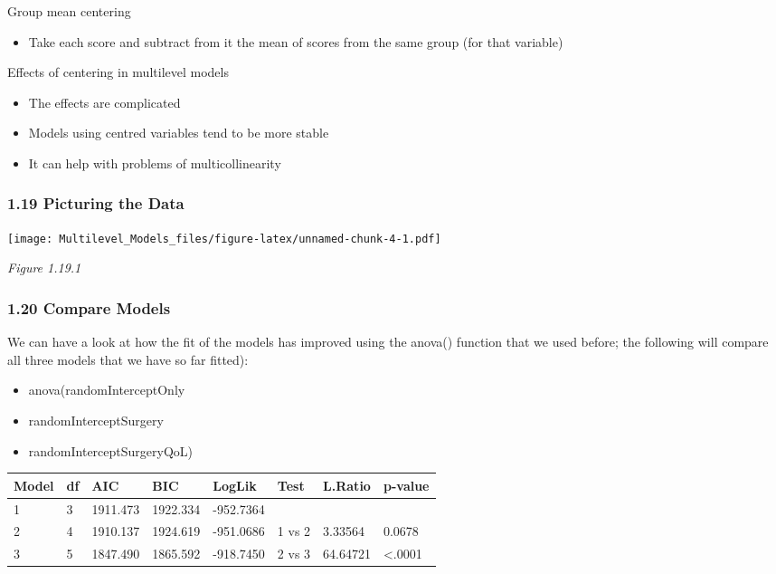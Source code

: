 \documentclass[
]{article}
\providecommand{\tightlist}{%
  \setlength{\itemsep}{0pt}\setlength{\parskip}{0pt}}
\begin{document}
Group mean centering

\begin{itemize}
\tightlist
\item
  Take each score and subtract from it the mean of scores from the same
  group (for that variable)
\end{itemize}

Effects of centering in multilevel models

\begin{itemize}
\tightlist
\item
  The effects are complicated
\item
  Models using centred variables tend to be more stable
\item
  It can help with problems of multicollinearity
\end{itemize}

\hypertarget{picturing-the-data}{%
\subsubsection{1.19 Picturing the Data}\label{picturing-the-data}}

\texttt{[image: Multilevel\_Models\_files/figure-latex/unnamed-chunk-4-1.pdf]}

\emph{Figure 1.19.1}

\hypertarget{compare-models}{%
\subsubsection{1.20 Compare Models}\label{compare-models}}

We can have a look at how the fit of the models has improved using the
anova() function that we used before; the following will compare all
three models that we have so far fitted):

\begin{itemize}
\tightlist
\item
  anova(randomInterceptOnly
\item
  randomInterceptSurgery
\item
  randomInterceptSurgeryQoL)
\end{itemize}

\begin{longtable}[]{@{}llllllll@{}}
\toprule
Model & df & AIC & BIC & LogLik & Test & L.Ratio &
p-value\tabularnewline
\midrule
\endhead
1 & 3 & 1911.473 & 1922.334 & -952.7364 & & &\tabularnewline
2 & 4 & 1910.137 & 1924.619 & -951.0686 & 1 vs 2 & 3.33564 &
0.0678\tabularnewline
3 & 5 & 1847.490 & 1865.592 & -918.7450 & 2 vs 3 & 64.64721 &
\textless.0001\tabularnewline
\bottomrule
\end{longtable}
\end{document}
